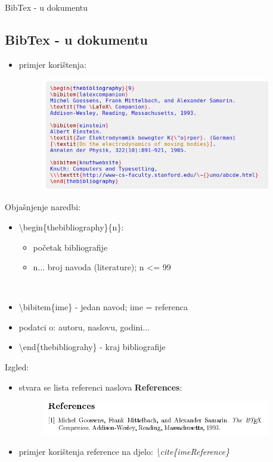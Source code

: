 \documentclass{beamer}
\begin{document}
\begin{frame}{BibTex - u dokumentu}
\subsection{BibTex - u dokumentu}
\begin{itemize}
    \item primjer korištenja:
    \begin{figure}
    \includegraphics[width=10cm]{bibtexUDokumentu.png}
    \end{figure}
\end{itemize}    
\end{frame}

\begin{frame}
Objašnjenje naredbi:
\begin{itemize}
    \item \textbackslash begin\{thebibliography\}\{n\}:
        \begin{itemize}
            \item početak bibliografije \\
            \item n... broj navoda (literature); n \textless= 99 \\
        \end{itemize} \\
    \item \textbackslash bibitem\{ime\} - jedan navod; ime = referenca \\
    \item podatci o: autoru, naslovu, godini... \\
    \item \textbackslash end\{thebibliograhy\} - kraj bibliografije
\end{itemize}
Izgled:
\begin{itemize}
    \item stvara se lista referenci naslova \textbf{References}: 
    \begin{figure}
    \includegraphics[width=10cm]{bibtexUDokumentu2.png}
    \end{figure}
    \item primjer korištenja reference na djelo: \textit{\textbackslash cite\{imeReference\}} \\
\end{itemize}
\end{frame}
\end{document}
